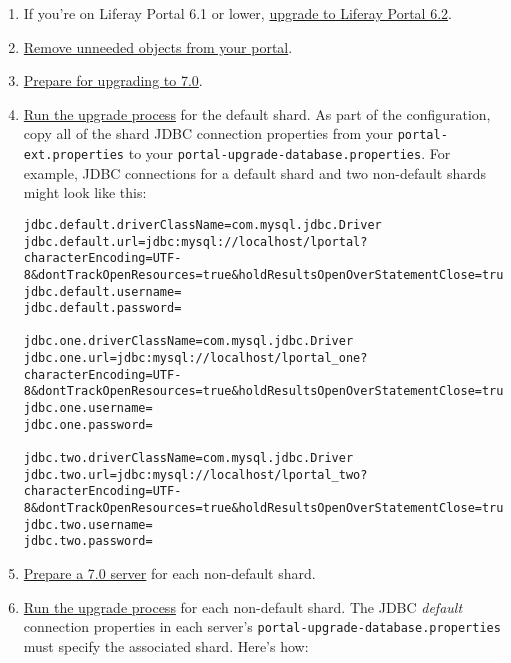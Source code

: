 \begin{enumerate}
\def\labelenumi{\arabic{enumi}.}
\item
  If you're on Liferay Portal 6.1 or lower,
  \href{/docs/6-2/deploy/-/knowledge_base/d/upgrading-liferay}{upgrade
  to Liferay Portal 6.2}.
\item
  \href{/docs/7-0/deploy/-/knowledge_base/d/pre-upgrade-speed-up-the-process}{Remove
  unneeded objects from your portal}.
\item
  \href{/docs/7-0/deploy/-/knowledge_base/d/preparing-an-upgrade-to-liferay-7}{Prepare
  for upgrading to 7.0}.
\item
  \href{/docs/7-0/deploy/-/knowledge_base/d/running-the-upgrade-process}{Run
  the upgrade process} for the default shard. As part of the
  configuration, copy all of the shard JDBC connection properties from
  your \texttt{portal-ext.properties} to your
  \texttt{portal-upgrade-database.properties}. For example, JDBC
  connections for a default shard and two non-default shards might look
  like this:

\begin{verbatim}
jdbc.default.driverClassName=com.mysql.jdbc.Driver
jdbc.default.url=jdbc:mysql://localhost/lportal?characterEncoding=UTF-8&dontTrackOpenResources=true&holdResultsOpenOverStatementClose=true&useFastDateParsing=false&useUnicode=true
jdbc.default.username=
jdbc.default.password=

jdbc.one.driverClassName=com.mysql.jdbc.Driver
jdbc.one.url=jdbc:mysql://localhost/lportal_one?characterEncoding=UTF-8&dontTrackOpenResources=true&holdResultsOpenOverStatementClose=true&useFastDateParsing=false&useUnicode=true
jdbc.one.username=
jdbc.one.password=

jdbc.two.driverClassName=com.mysql.jdbc.Driver
jdbc.two.url=jdbc:mysql://localhost/lportal_two?characterEncoding=UTF-8&dontTrackOpenResources=true&holdResultsOpenOverStatementClose=true&useFastDateParsing=false&useUnicode=true
jdbc.two.username=
jdbc.two.password=
\end{verbatim}
\item
  \href{/docs/7-0/deploy/-/knowledge_base/d/deploying-product}{Prepare a
  7.0 server} for each non-default shard.
\item
  \href{/docs/7-0/deploy/-/knowledge_base/d/running-the-upgrade-process}{Run
  the upgrade process} for each non-default shard. The JDBC
  \emph{default} connection properties in each server's
  \texttt{portal-upgrade-database.properties} must specify the
  associated shard. Here's how:


\end{enumerate}
